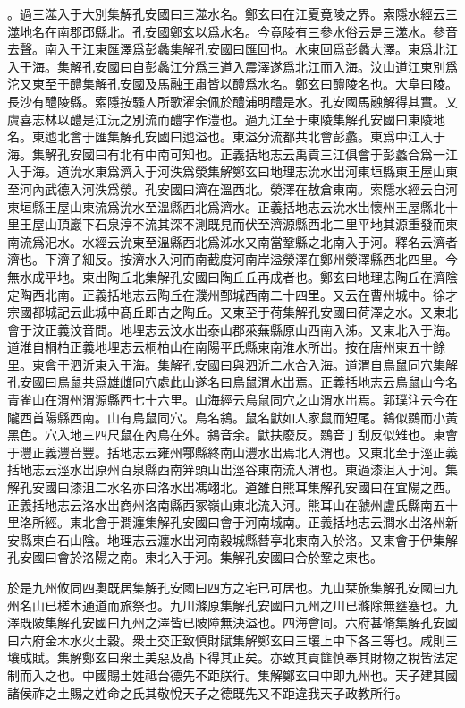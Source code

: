 。過三澨入于大別集解孔安國曰三澨水名。鄭玄曰在江夏竟陵之界。索隱水經云三澨地名在南郡邔縣北。孔安國鄭玄以爲水名。今竟陵有三參水俗云是三澨水。參音去聲。南入于江東匯澤爲彭蠡集解孔安國曰匯回也。水東回爲彭蠡大澤。東爲北江入于海。集解孔安國曰自彭蠡江分爲三道入震澤遂爲北江而入海。汶山道江東別爲沱又東至于醴集解孔安國及馬融王肅皆以醴爲水名。鄭玄曰醴陵名也。大阜曰陵。長沙有醴陵縣。索隱按騷人所歌濯余佩於醴浦明醴是水。孔安國馬融解得其實。又虞喜志林以醴是江沅之別流而醴字作澧也。過九江至于東陵集解孔安國曰東陵地名。東迆北會于匯集解孔安國曰迆溢也。東溢分流都共北會彭蠡。東爲中江入于海。集解孔安國曰有北有中南可知也。正義括地志云禹貢三江俱會于彭蠡合爲一江入于海。道沇水東爲濟入于河泆爲滎集解鄭玄曰地理志沇水岀河東垣縣東王屋山東至河內武德入河泆爲滎。孔安國曰濟在溫西北。滎澤在敖倉東南。索隱水經云自河東垣縣王屋山東流爲沇水至溫縣西北爲濟水。正義括地志云沇水岀懷州王屋縣北十里王屋山頂巖下石泉渟不流其深不測既見而伏至濟源縣西北二里平地其源重發而東南流爲汜水。水經云沇東至溫縣西北爲泲水又南當鞏縣之北南入于河。釋名云濟者濟也。下濟子細反。按濟水入河而南截度河南岸溢滎澤在鄭州滎澤縣西北四里。今無水成平地。東岀陶丘北集解孔安國曰陶丘丘再成者也。鄭玄曰地理志陶丘在濟陰定陶西北南。正義括地志云陶丘在濮州鄄城西南二十四里。又云在曹州城中。徐才宗國都城記云此城中髙丘即古之陶丘。又東至于荷集解孔安國曰荷澤之水。又東北會于汶正義汶音問。地埋志云汶水岀泰山郡萊蕪縣原山西南入泲。又東北入于海。道淮自桐柏正義地埋志云桐柏山在南陽平氏縣東南淮水所岀。按在唐州東五十餘里。東會于泗沂東入于海。集解孔安國曰與泗沂二水合入海。道渭自鳥鼠同穴集解孔安國曰鳥鼠共爲雄雌同穴處此山遂名曰鳥鼠渭水岀焉。正義括地志云鳥鼠山今名青雀山在渭州渭源縣西七十六里。山海經云鳥鼠同穴之山渭水岀焉。郭璞注云今在隴西首陽縣西南。山有鳥鼠同穴。鳥名䳜。鼠名鼣如人家鼠而短尾。䳜似鵽而小黃黑色。穴入地三四尺鼠在內鳥在外。䳜音余。鼣扶廢反。鵽音丁刮反似雉也。東會于灃正義灃音豐。括地志云雍州鄠縣終南山灃水岀焉北入渭也。又東北至于涇正義括地志云涇水岀原州百泉縣西南笄頭山岀涇谷東南流入渭也。東過漆沮入于河。集解孔安國曰漆沮二水名亦曰洛水岀馮翊北。道雒自熊耳集解孔安國曰在宜陽之西。正義括地志云洛水岀商州洛南縣西冢嶺山東北流入河。熊耳山在虢州盧氏縣南五十里洛所經。東北會于澗瀍集解孔安國曰會于河南城南。正義括地志云澗水岀洛州新安縣東白石山陰。地理志云瀍水岀河南穀城縣朁亭北東南入於洛。又東會于伊集解孔安國曰會於洛陽之南。東北入于河。集解孔安國曰合於鞏之東也。


於是九州攸同四奧既居集解孔安國曰四方之宅已可居也。九山栞旅集解孔安國曰九州名山已槎木通道而旅祭也。九川滌原集解孔安國曰九州之川已滌除無壅塞也。九澤既陂集解孔安國曰九州之澤皆已陂障無決溢也。四海會同。六府甚脩集解孔安國曰六府金木水火土穀。衆土交正致慎財賦集解鄭玄曰三壤上中下各三等也。咸則三壤成賦。集解鄭玄曰衆土美惡及髙下得其正矣。亦致其貢篚慎奉其財物之稅皆法定制而入之也。中國賜土姓祗台德先不距朕行。集解鄭玄曰中即九州也。天子建其國諸侯祚之土賜之姓命之氏其敬悅天子之德既先又不距違我天子政教所行。

